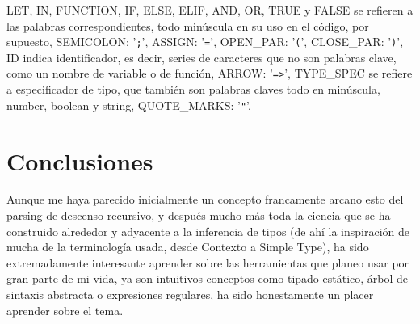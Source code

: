\documentclass{article}
\begin{document}
LET, IN, FUNCTION, IF, ELSE, ELIF, AND, OR, TRUE y FALSE se refieren a las palabras correspondientes, todo minúscula en su uso en el código, por supuesto, SEMICOLON: '\texttt{;}', ASSIGN: '\texttt{=}', OPEN\_PAR: '\texttt{(}', CLOSE\_PAR: '\texttt{)}', ID indica identificador, es decir, series de caracteres que no son palabras clave, como un nombre de variable o de función, ARROW: '\texttt{=>}', TYPE\_SPEC se refiere a especificador de tipo, que también son palabras claves todo en minúscula, number, boolean y string, QUOTE\_MARKS: '\texttt{"}'.

\section*{Conclusiones}
Aunque me haya parecido inicialmente un concepto francamente arcano esto del parsing de descenso recursivo, y después mucho más toda la ciencia que se ha construido alrededor y adyacente a la inferencia de tipos (de ahí la inspiración de mucha de la terminología usada, desde Contexto a Simple Type), ha sido extremadamente interesante aprender sobre las herramientas que planeo usar por gran parte de mi vida, ya son intuitivos conceptos como tipado estático, árbol de sintaxis abstracta o expresiones regulares, ha sido honestamente un placer aprender sobre el tema.
\end{document}
